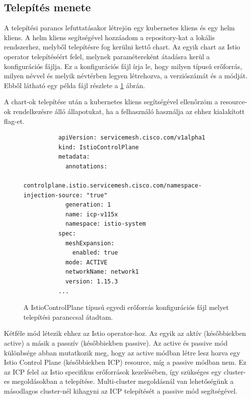 \subsection*{Telepítés menete}
A telepítési parancs lefuttatásakor létrejön egy kubernetes kliens és egy helm kliens.
A helm kliens segítségével hozzáadom a repository-kat a lokális rendszerhez, melyből telepítésre fog kerülni kettő chart.
Az egyik chart az Istio operator telepítéséért felel, melynek paramétereként átadásra kerül a konfigurációs fájlja.
Ez a konfigurációs fájl írja le, hogy milyen típusú erőforrás, milyen névvel és melyik névtérben legyen létrehozva, a verziószámát és a módját.
Ebből látható egy példa fájl részlete a \ref{sample-icp-config} ábrán.

A chart-ok telepítése után a kubernetes kliens segítségével ellenőrzöm a resource-ok rendelkezésre álló állapotukat, ha a felhasználó használja az ehhez kialakított flag-et.

\begin{figure}
  \centering
  \begin{minipage}{\linewidth}
      \begin{lstlisting}
          apiVersion: servicemesh.cisco.com/v1alpha1
          kind: IstioControlPlane
          metadata:
            annotations:
              controlplane.istio.servicemesh.cisco.com/namespace-injection-source: "true"
            generation: 1
            name: icp-v115x
            namespace: istio-system
          spec:
            meshExpansion:
              enabled: true
            mode: ACTIVE
            networkName: network1
            version: 1.15.3
          ...
      \end{lstlisting}
  \end{minipage}
  \caption{A IstioControlPlane típusú egyedi erőforrás konfigurációs fájl melyet telepítési paranccsal átadtam.}
    \label{sample-icp-config}
\end{figure}

\newpage

Kétféle mód létezik ehhez az Istio operator-hoz. Az egyik az aktív (későbbiekben active) a másik a passzív (későbbiekben passive).
Az active és passive mód különbsége abban mutatkozik meg, hogy az active módban létre lesz hozva egy Istio Control Plane (későbbiekben ICP) resource, míg a passive módban nem.
Ez az ICP felel az Istio specifikus erőforrások kezelésében, így szükséges egy cluster-es megoldásokban a telepítése.
Multi-cluster megoldásnál van lehetőségünk a másodlagos cluster-nél kihagyni az ICP telepítését a passive mód segítségével.

